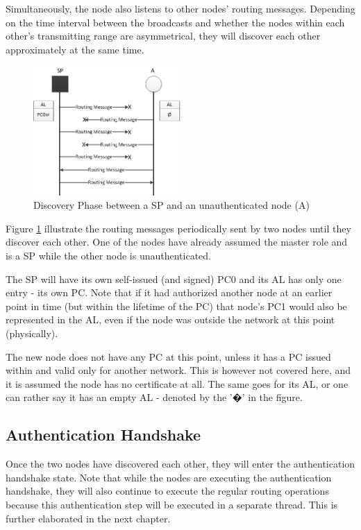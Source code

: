 Simultaneously, the node also listens to other nodes' routing messages.
Depending on the time interval between the broadcasts and whether the nodes
within each other's transmitting range are asymmetrical, they will discover each
other approximately at the same time.

\begin{figure}[h]
	\centering
  	\includegraphics[width=0.5\textwidth]{images/node_states_discovery.png}
  	\caption{Discovery Phase between a \acf{SP} and an unauthenticated node (A)}
	\label{fig:node_states_discovery}
\end{figure}

Figure \ref{fig:node_states_discovery} illustrate the routing messages
periodically sent by two nodes until they discover each other. One of the nodes
have already assumed the master role and is a \ac{SP} while the other node is
unauthenticated.

The \ac{SP} will have its own self-issued (and signed) \ac{PC0} and its \ac{AL}
has only one entry - its own \ac{PC}. Note that if it had authorized another
node at an earlier point in time (but within the lifetime of the \ac{PC}) that
node's \ac{PC1} would also be represented in the \ac{AL}, even if the node was
outside the network at this point (physically).

The new node does not have any \ac{PC} at this point, unless it has a \ac{PC}
issued within and valid only for another network. This is however not covered
here, and it is assumed the node has no certificate at all. The same goes for
its \ac{AL}, or one can rather say it has an empty \ac{AL} - denoted by the '�'
in the figure.

\subsection{Authentication Handshake}
Once the two nodes have discovered each other, they will enter the
authentication handshake state. Note that while the nodes are executing the
authentication handshake, they will also continue to execute the regular routing
operations because this authentication step will be executed in a separate
thread. This is further elaborated in the next chapter.

